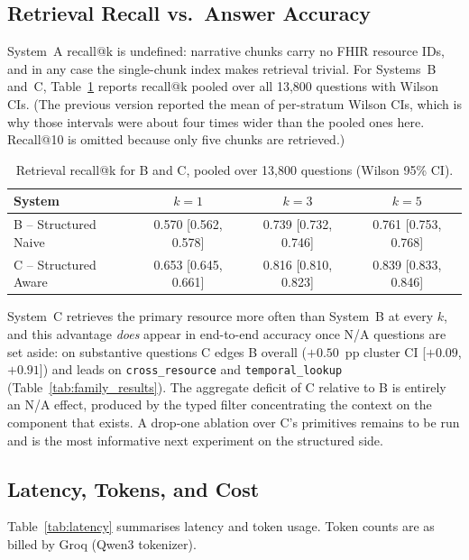 \subsection{Retrieval Recall vs.\ Answer Accuracy}
\label{sec:results:recall}

System~A recall@k is undefined: narrative chunks carry no FHIR resource IDs, and in any
case the single-chunk index makes retrieval trivial.  For Systems~B and~C,
Table~\ref{tab:recall} reports recall@k pooled over all 13,800 questions with Wilson CIs.
(The previous version reported the mean of per-stratum Wilson CIs, which is why those
intervals were about four times wider than the pooled ones here.  Recall@10 is omitted
because only five chunks are retrieved.)

\begin{table}[htbp]
\centering
\caption{Retrieval recall@k for B and C, pooled over 13,800 questions (Wilson 95\% CI).}
\label{tab:recall}
\begin{tabular}{lccc}
\toprule
System & $k=1$ & $k=3$ & $k=5$ \\
\midrule
B -- Structured Naive & 0.570 [0.562, 0.578] & 0.739 [0.732, 0.746] & 0.761 [0.753, 0.768] \\
C -- Structured Aware & 0.653 [0.645, 0.661] & 0.816 [0.810, 0.823] & 0.839 [0.833, 0.846] \\
\bottomrule
\end{tabular}
\end{table}

System~C retrieves the primary resource more often than System~B at every $k$, and this
advantage \emph{does} appear in end-to-end accuracy once N/A questions are set aside:
on substantive questions C edges B overall ($+0.50$~pp cluster CI [$+0.09$, $+0.91$])
and leads on \texttt{cross\_resource} and \texttt{temporal\_lookup}
(Table~\ref{tab:family_results}).  The aggregate deficit of C relative to B is entirely
an N/A effect, produced by the typed filter concentrating the context on the component
that exists.  A drop-one ablation over C's primitives remains to be run and is the most
informative next experiment on the structured side.

\subsection{Latency, Tokens, and Cost}
\label{sec:results:latency}

Table~\ref{tab:latency} summarises latency and token usage.  Token counts are as billed by
Groq (Qwen3 tokenizer).


